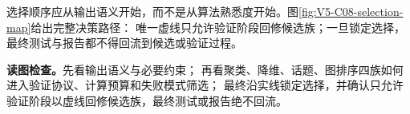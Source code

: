 \documentclass[UTF8,a4paper,11pt,openany]{ctexbook}
\begin{document}
\setcounter{page}{747}
\setcounter{chapter}{37}
\setcounter{section}{4}
\setcounter{figure}{6}
\pagestyle{headings}
选择顺序应从输出语义开始，而不是从算法熟悉度开始。图\ref{fig:V5-C08-selection-map}给出完整决策路径：
唯一虚线只允许验证阶段回修候选族；一旦锁定选择，最终测试与报告都不得回流到候选或验证过程。

\FloatBarrier
\noindent\textbf{读图检查。}先看输出语义与必要约束；
再看聚类、降维、话题、图排序四族如何进入验证协议、计算预算和失败模式筛选；
最终沿实线锁定选择，并确认只允许验证阶段以虚线回修候选族，最终测试或报告绝不回流。
\end{document}
